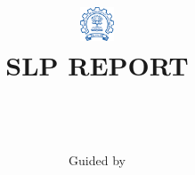 \documentclass[12pt]{beamer}
\title[\textbf{\uppercase{\projectTitle}}]{ 
  \includegraphics[height=1cm]{images/IITB_logo.png} \\
  \large {SLP REPORT}
  \\ [0.5cm]
  \HRule{0.5pt} \\
  \LARGE \textbf{\uppercase{\projectTitle}}
  \HRule{1pt}
}
\author[\studentName]{
  \studentName \\
  Guided by \guideName
}
\institute[IITB] {
  \department \\
  \instituteName \\
}
\date{}
\begin{document}
\frame{\titlepage}









\end{document}
